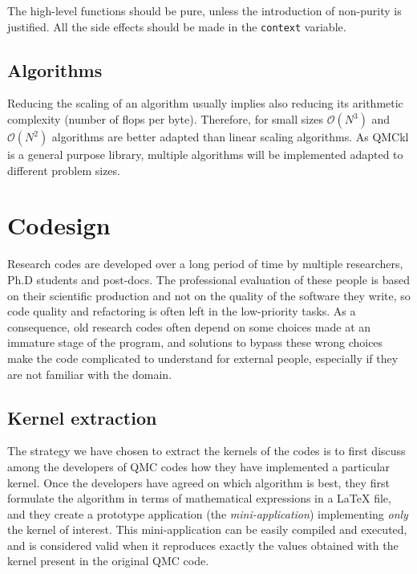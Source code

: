 The high-level  functions should be pure,  unless the introduction
of non-purity is justified. All the side effects should be made in
the \texttt{context} variable.


\subsection{Algorithms}

Reducing the scaling of an  algorithm usually implies also reducing
its arithmetic  complexity (number  of flops per  byte). Therefore,
for  small  sizes   \(\mathcal{O}(N^3)\)  and  \(\mathcal{O}(N^2)\)
algorithms are  better adapted than linear  scaling algorithms.  As
\ac{QMCkl} is a  general purpose library, multiple  algorithms will be
implemented adapted to different problem sizes.



\section{Codesign}
\label{sec:codesign}

Research codes are developed over a long period of time by multiple
researchers, Ph.D students and post-docs. The professional evaluation
of these people is based on their scientific production and not on the
quality of the software they write, so code quality and refactoring is
often left in the low-priority tasks. As a consequence, old research
codes often depend on some choices made at an immature stage of the
program, and solutions to bypass these wrong choices make the code
complicated to understand for external people, especially if they are
not familiar with the domain.

\subsection{Kernel extraction}

The strategy we have chosen to extract the kernels of the codes is to
first discuss among the developers of \ac{QMC} codes how they have
implemented a particular kernel. Once the developers have agreed on
which algorithm is best, they first formulate the algorithm in terms
of mathematical expressions in a {\LaTeX} file, and they create a prototype application 
(the \emph{mini-application}) implementing \emph{only} the kernel of
interest. This mini-application can be easily compiled and executed,
and is considered valid when it reproduces exactly the values obtained
with the kernel present in the original \ac{QMC} code.

